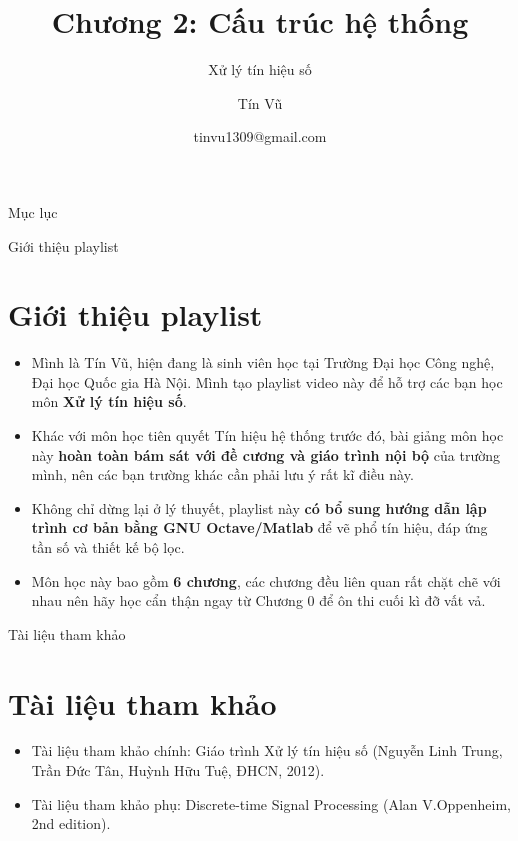 \documentclass[8pt]{beamer}
\title[Chương 2: Cấu trúc hệ thống] %
{Chương 2: Cấu trúc hệ thống}
\subtitle{Xử lý tín hiệu số}
\author[Xử lý tín hiệu số] %
{Tín Vũ}
\date[VLC 2021] %
{tinvu1309@gmail.com}
\begin{document}
\frame{\titlepage}
\begin{frame}{Mục lục}
\tableofcontents
\end{frame}
\begin{frame}{Giới thiệu playlist}
\section{Giới thiệu playlist}
	\begin{itemize}
		\item Mình là Tín Vũ, hiện đang là sinh viên học tại Trường Đại học Công nghệ, Đại học Quốc gia Hà Nội. Mình tạo playlist video này để hỗ trợ các bạn học môn \textbf{Xử lý tín hiệu số}.
\item Khác với môn học tiên quyết \alert{Tín hiệu hệ thống} trước đó, bài giảng môn học này \textbf{hoàn toàn bám sát với đề cương và giáo trình nội bộ} của trường mình, nên các bạn trường khác cần phải lưu ý rất kĩ điều này.
\item Không chỉ dừng lại ở lý thuyết, playlist này \textbf{có bổ sung hướng dẫn lập trình cơ bản bằng GNU Octave/Matlab} để vẽ phổ tín hiệu, đáp ứng tần số và thiết kế bộ lọc.
\item Môn học này bao gồm \textbf{6 chương}, các chương đều liên quan rất chặt chẽ với nhau nên hãy học cẩn thận ngay từ \alert{Chương 0} để ôn thi cuối kì đỡ vất vả.
	\end{itemize}
\end{frame}
\begin{frame}{Tài liệu tham khảo}
\section{Tài liệu tham khảo}
\begin{itemize}
		\item Tài liệu tham khảo chính: Giáo trình Xử lý tín hiệu số (Nguyễn Linh Trung, Trần Đức Tân, Huỳnh Hữu Tuệ, ĐHCN, 2012).
		\item Tài liệu tham khảo phụ: Discrete-time Signal Processing (Alan V.Oppenheim, 2nd edition). 
	\end{itemize}
\end{frame}
\end{document}
